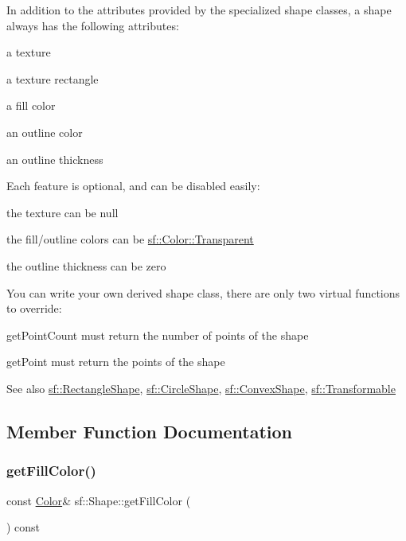 In addition to the attributes provided by the specialized shape classes, a shape always has the following attributes\+: \begin{DoxyItemize}
\item a texture \item a texture rectangle \item a fill color \item an outline color \item an outline thickness\end{DoxyItemize}
Each feature is optional, and can be disabled easily\+: \begin{DoxyItemize}
\item the texture can be null \item the fill/outline colors can be \hyperlink{classsf_1_1_color_a569b45471737f770656f50ae7bbac292}{sf\+::\+Color\+::\+Transparent} \item the outline thickness can be zero\end{DoxyItemize}
You can write your own derived shape class, there are only two virtual functions to override\+: \begin{DoxyItemize}
\item get\+Point\+Count must return the number of points of the shape \item get\+Point must return the points of the shape\end{DoxyItemize}
\begin{DoxySeeAlso}{See also}
\hyperlink{classsf_1_1_rectangle_shape}{sf\+::\+Rectangle\+Shape}, \hyperlink{classsf_1_1_circle_shape}{sf\+::\+Circle\+Shape}, \hyperlink{classsf_1_1_convex_shape}{sf\+::\+Convex\+Shape}, \hyperlink{classsf_1_1_transformable}{sf\+::\+Transformable} 
\end{DoxySeeAlso}


\subsection{Member Function Documentation}
\mbox{\label{classsf_1_1_shape_ae3030128824e687f259d18addcf33528}} 
\subsubsection{\texorpdfstring{get\+Fill\+Color()}{getFillColor()}}
{\footnotesize\ttfamily const \hyperlink{classsf_1_1_color}{Color}\& sf\+::\+Shape\+::get\+Fill\+Color (\begin{DoxyParamCaption}{ }\end{DoxyParamCaption}) const}



